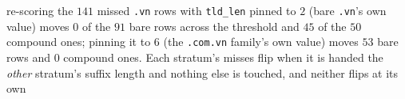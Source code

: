 re-scoring the $141$ missed \texttt{.vn} rows with \texttt{tld\_len} pinned to $2$ (bare \texttt{.vn}'s own value) moves $0$ of the $91$ bare rows across the threshold and $45$ of the $50$ compound ones; pinning it to $6$ (the \texttt{.com.vn} family's own value) moves $53$ bare rows and $0$ compound ones. Each stratum's misses flip when it is handed the \emph{other} stratum's suffix length and nothing else is touched, and neither flips at its own%
